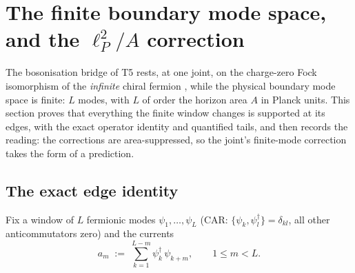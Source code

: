 \documentclass[11pt]{article}
\theoremstyle{definition}
\theoremstyle{plain}
\begin{document}
\section{The finite boundary mode space, and the $\ell_P^2/A$ correction}

\label{c:note.hawking.setting-finite-boundary-mode-space-p}
The bosonisation bridge of T5 rests, at one joint, on the charge-zero Fock isomorphism of the \emph{infinite} chiral fermion \cite{FrenkelKac1980}, while the physical boundary mode space is finite: $L$ modes, with $L$ of order the horizon area $A$ in Planck units. This section proves that everything the finite window changes is supported at its edges, with the exact operator identity and quantified tails, and then records the reading: the corrections are area-suppressed, so the joint's finite-mode correction takes the form of a prediction.

\subsection*{The exact edge identity}
\label{c:note.hawking.setting-exact-edge-identity}
Fix a window of $L$ fermionic modes $\psi_1, \dots, \psi_L$ (CAR: $\{\psi_k, \psi_l^\dagger\} = \delta_{kl}$, all other anticommutators zero) and the currents
\[
a_m \;:=\; \sum_{k=1}^{L-m} \psi_k^\dagger\,\psi_{k+m}, \qquad 1 \le m < L .
\]
\end{document}
